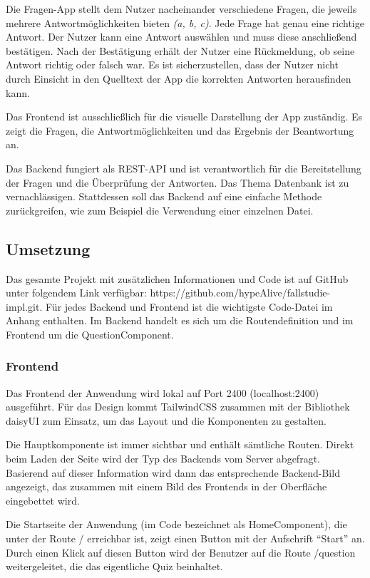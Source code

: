 \documentclass[biblatex]{lni}
\begin{document}
Die Fragen-App stellt dem Nutzer nacheinander verschiedene Fragen,
die jeweils mehrere Antwortmöglichkeiten bieten \textit{(a, b, c)}.
Jede Frage hat genau eine richtige Antwort.
Der Nutzer kann eine Antwort auswählen und muss diese anschließend bestätigen.
Nach der Bestätigung erhält der Nutzer eine Rückmeldung,
ob seine Antwort richtig oder falsch war.
Es ist sicherzustellen, dass der Nutzer nicht durch Einsicht in den Quelltext der App die korrekten Antworten herausfinden kann.

Das Frontend ist ausschließlich für die visuelle Darstellung der App zuständig.
Es zeigt die Fragen, die Antwortmöglichkeiten und das Ergebnis der Beantwortung an.

Das Backend fungiert als \ac{REST}-\ac{API} und ist verantwortlich für die Bereitstellung der Fragen und die Überprüfung der Antworten.
Das Thema Datenbank ist zu vernachlässigen.
Stattdessen soll das Backend auf eine einfache Methode zurückgreifen, wie zum Beispiel die Verwendung einer einzelnen Datei.

\subsection{Umsetzung}

Das gesamte Projekt mit zusätzlichen Informationen und Code ist auf GitHub unter folgendem Link verfügbar: https://github.com/hypeAlive/fallstudie-impl.git.
Für jedes Backend und Frontend ist die wichtigste Code-Datei im Anhang enthalten.
Im Backend handelt es sich um die Routendefinition und im Frontend um die QuestionComponent.

\subsubsection{Frontend}

Das Frontend der Anwendung wird lokal auf Port 2400 (localhost:2400) ausgeführt.
Für das Design kommt TailwindCSS zusammen mit der Bibliothek daisyUI zum Einsatz,
um das Layout und die Komponenten zu gestalten.

Die Hauptkomponente ist immer sichtbar und enthält sämtliche Routen.
Direkt beim Laden der Seite wird der Typ des Backends vom Server abgefragt.
Basierend auf dieser Information wird dann das entsprechende Backend-Bild angezeigt,
das zusammen mit einem Bild des Frontends in der Oberfläche eingebettet wird.

Die Startseite der Anwendung (im Code bezeichnet als HomeComponent),
die unter der Route / erreichbar ist, zeigt einen Button mit der Aufschrift “Start” an.
Durch einen Klick auf diesen Button wird der Benutzer auf die Route /question weitergeleitet,
die das eigentliche Quiz beinhaltet.
\end{document}

